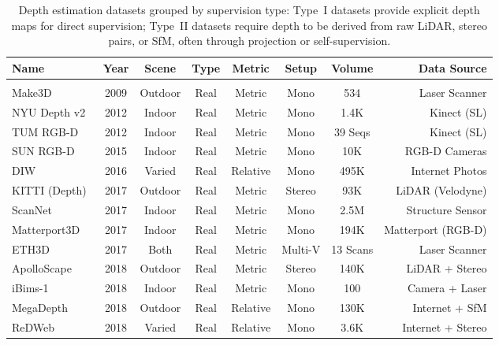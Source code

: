 \begin{table}[!t]
\centering
\caption{Depth estimation datasets grouped by supervision type: Type~I datasets provide explicit depth maps for direct supervision; Type~II datasets require depth to be derived from raw LiDAR, stereo pairs, or SfM, often through projection or self-supervision.}
\label{tab:depth_estimation_datasets}
\fontsize{9}{11}\selectfont
\setlength{\tabcolsep}{2.5mm}
\begin{tabular}{lccccccr}
\toprule
\textbf{Name} & \textbf{Year} & \textbf{Scene} & \textbf{Type} & \textbf{Metric} & \textbf{Setup} & \textbf{Volume} & \textbf{Data Source} \\
\midrule
\rowcolor{lightgrey} \multicolumn{8}{l}{$\bullet$ \textit{Type I: Datasets with Explicit Depth Maps (Direct Supervision})} \\
Make3D~\cite{saxena2008make3d} & 2009 & Outdoor & Real & Metric & Mono & 534 & Laser Scanner \\
NYU Depth v2~\cite{silberman2012nyudv2} & 2012 & Indoor & Real & Metric & Mono & 1.4K & Kinect (SL) \\
TUM RGB-D~\cite{Sturm2012TUMRGBD} & 2012 & Indoor & Real & Metric & Mono & 39 Seqs & Kinect (SL) \\
SUN RGB-D~\cite{song2015sunrgbd} & 2015 & Indoor & Real & Metric & Mono & 10K & RGB-D Cameras \\
DIW~\cite{chen2016single} & 2016 & Varied & Real & Relative & Mono & 495K & Internet Photos \\
KITTI (Depth)~\cite{uhrig2017sparsity} & 2017 & Outdoor & Real & Metric & Stereo & 93K & LiDAR (Velodyne) \\
ScanNet~\cite{dai2017scannet} & 2017 & Indoor & Real & Metric & Mono & 2.5M & Structure Sensor \\
Matterport3D~\cite{chang2017matterport3d} & 2017 & Indoor & Real & Metric & Mono & 194K & Matterport (RGB-D) \\
ETH3D~\cite{Schoeps2017ETH3D} & 2017 & Both & Real & Metric & Multi-V & 13 Scans & Laser Scanner \\
ApolloScape~\cite{wang2019apolloscape} & 2018 & Outdoor & Real & Metric & Stereo & 140K & LiDAR + Stereo \\
iBims-1~\cite{koch2018evaluation} & 2018 & Indoor & Real & Metric & Mono & 100 & Camera + Laser \\
MegaDepth~\cite{li2018megadepth} & 2018 & Outdoor & Real & Relative & Mono & 130K & Internet + SfM \\
ReDWeb~\cite{xian2018monocular} & 2018 & Varied & Real & Relative & Mono & 3.6K & Internet + Stereo \\

\end{tabular}
\end{table}
